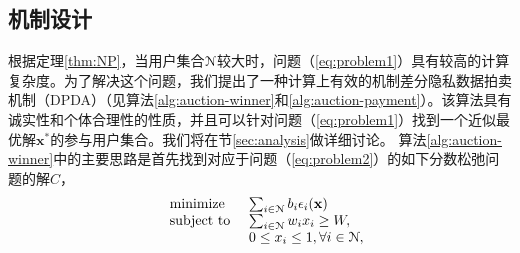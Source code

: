 	\subsection{机制设计}
	根据定理\ref{thm:NP}，当用户集合$\mathcal{N}$较大时，问题（\ref{eq:problem1}）具有较高的计算复杂度。为了解决这个问题，我们提出了一种计算上有效的机制{\kaishu 差分隐私数据拍卖机制（DPDA）}（见算法\ref{alg:auction-winner}和\ref{alg:auction-payment}）。该算法具有诚实性和个体合理性的性质，并且可以针对问题（\ref{eq:problem1}）找到一个近似最优解$\mathbf{x}^*$的参与用户集合。我们将在节\ref{sec:analysis}做详细讨论。
	算法\ref{alg:auction-winner}中的主要思路是首先找到对应于问题（\ref{eq:problem2}）的如下分数松弛问题的解$C$，
	\begin{equation}%
	\hspace{-0.0cm}
	\begin{array}
	[c]{lll}%
	&{\text{minimize}}&~\sum_{i\in\N}b_i\e_i(\mathbf{x})
	\\
	&\text{subject to}&~ \sum_{i\in\N}w_ix_i\ge W,\\
	&&~ 0\le x_i\le 1, \forall i\in\N,
	\end{array}
	\label{eq:problem3}
	\end{equation}
	
